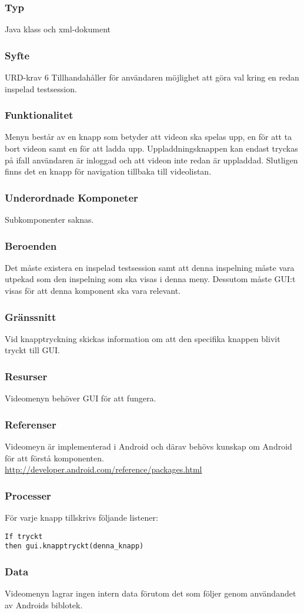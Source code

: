 \subsubsection{Typ}
Java klass och xml-dokument

\subsubsection{Syfte}
URD-krav 6
Tillhandahåller för användaren möjlighet att göra val kring en redan inspelad testsession.

\subsubsection{Funktionalitet}
Menyn består av en knapp som betyder att videon ska spelas upp, en för att ta bort videon samt en för att ladda upp. Uppladdningsknappen kan endast tryckas på ifall användaren är inloggad och att videon inte redan är uppladdad. Slutligen finns det en knapp för navigation tillbaka till videolistan.

\subsubsection{Underordnade Komponeter}
Subkomponenter saknas.

\subsubsection{Beroenden}
Det måste existera en inspelad testsession samt att denna inspelning måste vara utpekad som den inspelning som ska visas i denna meny. Dessutom måste GUI:t visas för att denna komponent ska vara relevant.

\subsubsection{Gränssnitt}
Vid knapptryckning skickas information om att den specifika knappen blivit tryckt till GUI.

\subsubsection{Resurser}
Videomenyn behöver GUI för att fungera.

\subsubsection{Referenser}
Videomeyn är implementerad i Android och därav behövs kunskap om Android för att förstå komponenten.
\url{http://developer.android.com/reference/packages.html}

\subsubsection{Processer}
För varje knapp tillskrivs följande listener:
\begin{verbatim}
If tryckt
then gui.knapptryckt(denna_knapp)
\end{verbatim}

\subsubsection{Data}
Videomenyn lagrar ingen intern data förutom det som följer genom användandet av Androids biblotek.